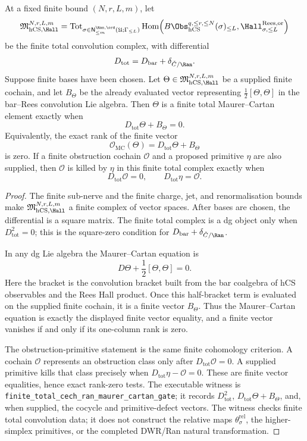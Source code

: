 \begin{proposition}
\label{prop:finite-total-cech-ran-maurer-cartan-gate}
\ClaimStatusProvedHere
At a fixed finite bound \((N,r,L,m)\), let
\[
 \mathfrak M^{N,r,L,m}_{\mathrm{hCS},\Hall}
 =
 \operatorname{Tot}_{\sigma\in
 \mathsf N^{\Ran,\ord}_{\le m}(\mathfrak U;\Gamma_{\le L})}
 \operatorname{Hom}\!\left(
 B\Obs_{\mathrm{hCS}}^{q,\le r,\le N}(\sigma)_{\le L},
 \Hall_{\sigma,\le L}^{\mathrm{Rees},\mathrm{or}}
 \right)
\]
be the finite total convolution complex, with differential
\[
D_{\mathrm{tot}}=D_{\mathrm{bar}}+\delta_{\check C/\Ran}.
\]
Suppose finite bases have been chosen. Let
\(\Theta\in \mathfrak M^{N,r,L,m}_{\mathrm{hCS},\Hall}\) be a supplied
finite cochain, and let \(B_\Theta\) be the already evaluated vector
representing \(\frac12[\Theta,\Theta]\) in the bar--Rees convolution
Lie algebra. Then \(\Theta\) is a finite total Maurer--Cartan element
exactly when
\[
D_{\mathrm{tot}}\Theta+B_\Theta=0.
\]
Equivalently, the exact rank of the finite vector
\[
\mathcal O_{\mathrm{MC}}(\Theta)
=D_{\mathrm{tot}}\Theta+B_\Theta
\]
is zero. If a finite obstruction cochain \(\mathcal O\) and a proposed
primitive \(\eta\) are also supplied, then \(\mathcal O\) is killed by
\(\eta\) in this finite total complex exactly when
\[
D_{\mathrm{tot}}\mathcal O=0,\qquad
D_{\mathrm{tot}}\eta=\mathcal O .
\]
\end{proposition}

\begin{proof}
The finite sub-nerve and the finite charge, jet, and renormalisation
bounds make \(\mathfrak M^{N,r,L,m}_{\mathrm{hCS},\Hall}\) a finite
complex of vector spaces. After bases are chosen, the differential is a
square matrix. The finite total complex is a dg object only when
\(D_{\mathrm{tot}}^2=0\); this is the square-zero condition for
\(D_{\mathrm{bar}}+\delta_{\check C/\Ran}\).

In any dg Lie algebra the Maurer--Cartan equation is
\[
D\Theta+\frac12[\Theta,\Theta]=0.
\]
Here the bracket is the convolution bracket built from the bar
coalgebra of hCS observables and the Rees Hall product. Once this
half-bracket term is evaluated on the supplied finite cochain, it is a
finite vector \(B_\Theta\). Thus the Maurer--Cartan equation is exactly
the displayed finite vector equality, and a finite vector vanishes if
and only if its one-column rank is zero.

The obstruction-primitive statement is the same finite cohomology
criterion. A cochain \(\mathcal O\) represents an obstruction class only
after \(D_{\mathrm{tot}}\mathcal O=0\). A supplied primitive kills that
class precisely when \(D_{\mathrm{tot}}\eta-\mathcal O=0\). These are
finite vector equalities, hence exact rank-zero tests. The executable
witness is
\texttt{finite\_total\_cech\_ran\_maurer\_cartan\_gate}; it records
\(D_{\mathrm{tot}}^2\), \(D_{\mathrm{tot}}\Theta+B_\Theta\), and, when
supplied, the cocycle and primitive-defect vectors. The witness checks
finite total convolution data; it does not construct the relative maps
\(\theta_\sigma^{\mathrm{rel}}\), the higher-simplex primitives, or the
completed DWR/Ran natural transformation.
\end{proof}

